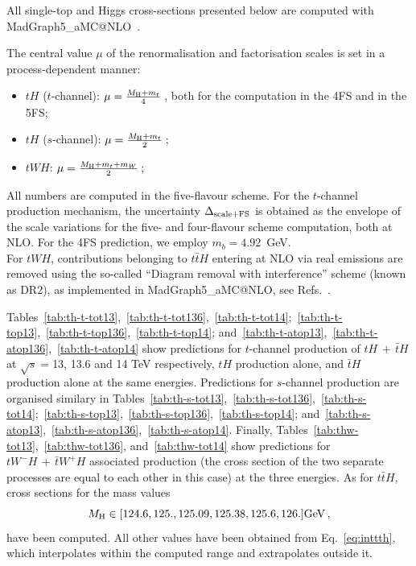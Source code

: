 All single-top and Higgs cross-sections presented below are computed with {\sc MadGraph5\_aMC@NLO}~\cite{Alwall:2014hca,Frederix:2018nkq}. 

The central value $\mu$ of the renormalisation and factorisation scales is set in a process-dependent manner:
\begin{itemize}
    \item $tH$ ($t$-channel): $\mu= \frac{M_\mathrm{H}+m_t}{4}\,$, both for the computation in the 4FS and in the 5FS;
    \item $tH$ ($s$-channel): $\mu= \frac{M_\mathrm{H}+m_t}{2}\,$;
    \item $tWH$: $\mu= \frac{M_\mathrm{H}+m_t+m_W}{2}\,$;
\end{itemize}
All numbers are computed in the five-flavour scheme. For the $t$-channel production mechanism, the uncertainty $\Delta_{\rm scale+\textrm{FS}}$
is obtained as the envelope of the scale variations for the
five- and four-flavour scheme computation, both at NLO. For the 4FS prediction, we employ $m_b=4.92$~GeV.\\
For $tWH$, contributions belonging to $t\bar t H$ entering at NLO via real emissions are removed using the so-called ``Diagram removal with interference'' 
scheme (known as DR2), as implemented in {\sc MadGraph5\_aMC@NLO}, see Refs.~\cite{Demartin:2016axk,Frixione:2019fxg}.

Tables~\ref{tab:th-t-tot13},~\ref{tab:th-t-tot136},~\ref{tab:th-t-tot14};~\ref{tab:th-t-top13},~\ref{tab:th-t-top136},~\ref{tab:th-t-top14}; and~\ref{tab:th-t-atop13},~\ref{tab:th-t-atop136},~\ref{tab:th-t-atop14}
show predictions for $t$-channel production of $tH\,+\,\bar tH$ at $\sqrt{s}=$13, 13.6 and 14 TeV respectively, $tH$ production alone, and $\bar tH$ production alone at the same energies. Predictions for 
$s$-channel production are organised similary in 
Tables~\ref{tab:th-s-tot13},~\ref{tab:th-s-tot136},~\ref{tab:th-s-tot14};~\ref{tab:th-s-top13},~\ref{tab:th-s-top136},~\ref{tab:th-s-top14}; and~\ref{tab:th-s-atop13},~\ref{tab:th-s-atop136},~\ref{tab:th-s-atop14}. 
Finally, Tables~\ref{tab:thw-tot13},~\ref{tab:thw-tot136}, and~\ref{tab:thw-tot14}
show predictions for $tW^-H \,+ \,\bar t W^+H$ associated production (the cross section of the two separate processes are equal to each other in this case) at the three energies.
As for $t\bar t H$, cross sections
for the mass values
\begin{equation}
    M_\mathrm{H} \in [ 124.6, 125., 125.09, 125.38, 125.6, 126.] \rm GeV\,,
\end{equation}
have been computed. All other values have been obtained from Eq.~\eqref{eq:inttth},
which interpolates within the computed range and extrapolates outside it.




